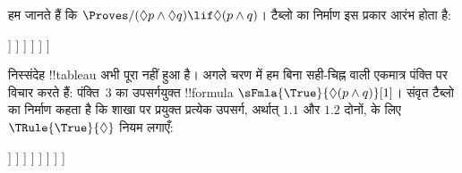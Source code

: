 \documentclass[../../../include/open-logic-section]{subfiles}
\begin{document}
{
\begin{ex}
  हम जानते हैं कि $\Proves/ (\Diamond p \land \Diamond q) \lif
  \Diamond(p \land q)$। टैब्लो का निर्माण इस प्रकार आरंभ होता है:
  \begin{oltableau}
    [\pFmla{\False}{(\Diamond p \land \Diamond q) \lif \Diamond(p \land q)}{1},
      just = \TAss, checked
      [\pFmla{\True}{\Diamond p \land \Diamond q}{1},
        just = {\TRule{\False}{\lif}[1]}, checked
        [\pFmla{\False}{\Diamond(p \land q)}{1},
          just = {\TRule{\False}{\lif}[1]}
          [\pFmla{\True}{\Diamond p}{1},
            just = {\TRule{\True}{\land}[2]}, checked
            [\pFmla{\True}{\Diamond q}{1},
              just = {\TRule{\True}{\land}[2]}, checked
              [\pFmla{\True}{p}{1.1}, 
                just = {\TRule{\True}{\Diamond}[4]}, checked
                [\pFmla{\True}{q}{1.2}, 
                  just = {\TRule{\True}{\Diamond}[5]}, checked
                ]
              ]
            ]
          ]
        ]
      ]
    ]
  \end{oltableau}
  निस्संदेह !!{tableau} अभी पूरा नहीं हुआ है। अगले चरण में हम बिना सही-चिह्न
  वाली एकमात्र पंक्ति पर विचार करते हैं: पंक्ति~$3$ का उपसर्गयुक्त
  !!{formula} $\sFmla{\True}{\Diamond(p \land q)}[1]$। संवृत टैब्लो का
  निर्माण कहता है कि शाखा पर प्रयुक्त प्रत्येक उपसर्ग, अर्थात् $1.1$ और
  $1.2$ दोनों, के लिए $\TRule{\True}{\Diamond}$ नियम लगाएँ:
  \begin{oltableau}
    [\pFmla{\False}{\Diamond(p \land q) \lif (\Diamond p \land \Diamond q)}{1},
      just = \TAss, checked
      [\pFmla{\True}{\Diamond p \land \Diamond q}{1},
        just = {\TRule{\False}{\lif}[1]}, checked
        [\pFmla{\False}{\Diamond (p \land q)}{1},
          just = {\TRule{\False}{\lif}[1]}
          [\pFmla{\True}{\Diamond p}{1},
            just = {\TRule{\True}{\land}[2]}, checked
            [\pFmla{\True}{\Diamond q}{1},
              just = {\TRule{\True}{\land}[2]}, checked
              [\pFmla{\True}{p}{1.1}, 
                just = {\TRule{\True}{\Diamond}[4]}, checked
                [\pFmla{\True}{q}{1.2}, 
                  just = {\TRule{\True}{\Diamond}[5]}, checked
                  [\pFmla{\False}{p \land q}{1.1}, 
                    just = {\TRule{\False}{\Diamond}[3]}
                    [\pFmla{\False}{p \land q}{1.2}, 
                      just = {\TRule{\False}{\Diamond}[3]}
                    ]
                  ]
                ]
              ]
            ]
          ]
        ]
      ]
    ]
  \end{oltableau}

\end{ex}}
\end{document}
